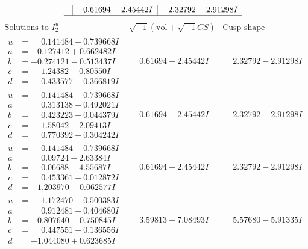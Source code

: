 \documentclass[1p]{elsarticle_modified}
\theoremstyle{definition}
\newcommand{\I}{\sqrt{-1}}
\begin{document}
$$\begin{array}{c|c|c}
 & \phantom{-}0.61694 - 2.45442 I & \phantom{-}2.32792 + 2.91298 I\\
 \hline 
 \end{array}$$\newpage$$\begin{array}{c|c|c}  
\text{Solutions to }I^u_{2}& \I (\text{vol} + \sqrt{-1}CS) & \text{Cusp shape}\\
 \hline 
\begin{aligned}
u &= \phantom{-}0.141484 - 0.739668 I \\
a &= -0.127412 + 0.662482 I \\
b &= -0.274121 - 0.513437 I \\
c &= \phantom{-}1.24382 + 0.80550 I \\
d &= \phantom{-}0.433577 + 0.366819 I\end{aligned}
 & \phantom{-}0.61694 + 2.45442 I & \phantom{-}2.32792 - 2.91298 I \\ \hline\begin{aligned}
u &= \phantom{-}0.141484 - 0.739668 I \\
a &= \phantom{-}0.313138 + 0.492021 I \\
b &= \phantom{-}0.423223 + 0.044379 I \\
c &= \phantom{-}1.58042 - 2.09413 I \\
d &= \phantom{-}0.770392 - 0.304242 I\end{aligned}
 & \phantom{-}0.61694 + 2.45442 I & \phantom{-}2.32792 - 2.91298 I \\ \hline\begin{aligned}
u &= \phantom{-}0.141484 - 0.739668 I \\
a &= \phantom{-}0.09724 - 2.63384 I \\
b &= \phantom{-}0.06688 + 4.55687 I \\
c &= \phantom{-}0.453361 - 0.012872 I \\
d &= -1.203970 - 0.062577 I\end{aligned}
 & \phantom{-}0.61694 + 2.45442 I & \phantom{-}2.32792 - 2.91298 I \\ \hline\begin{aligned}
u &= \phantom{-}1.172470 + 0.500383 I \\
a &= \phantom{-}0.912481 - 0.404680 I \\
b &= -0.807640 - 0.750845 I \\
c &= \phantom{-}0.447551 + 0.136556 I \\
d &= -1.044080 + 0.623685 I\end{aligned}
 & \phantom{-}3.59813 + 7.08493 I & \phantom{-}5.57680 - 5.91335 I \\ \hline\begin{aligned}

\end{aligned}
\end{array}$$
\end{document}
